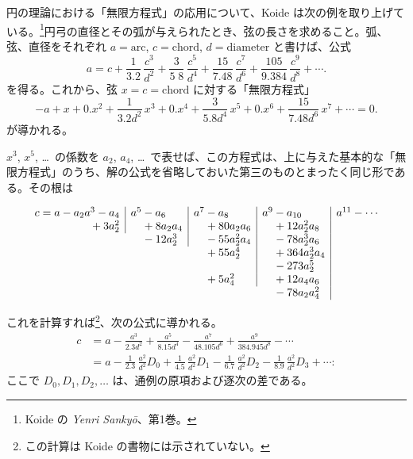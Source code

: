\documentclass[11pt]{article}
\newcommand{\scanpage}[2]{\clearpage\setcounter{footnote}{0}\noindent{\footnotesize\color{gray}PDF #1 頁 · #2}\par\medskip}
\begin{document}
円の理論における「無限方程式」の応用について、Koide は次の例を取り上げている。\footnote{Koide の \emph{Yenri Sankyō}、第1巻。}円弓の直径とその弧が与えられたとき、弦の長さを求めること。弧、弦、直径をそれぞれ $a=\mathrm{arc}$, $c=\mathrm{chord}$, $d=\mathrm{diameter}$ と書けば、公式
\[
a=c+\frac{1}{3.2}\,\frac{c^3}{d^2}+\frac{3}{5\;8}\mbox{}\,\frac{c^5}{d^4}+\frac{15}{7.48}\,\frac{c^7}{d^6}+\frac{105}{9.384}\,\frac{c^9}{d^8}+\cdots.
\]
を得る。これから、弦 $x=c=\mathrm{chord}$ に対する「無限方程式」
\[
-a+x+0.x^2+\frac{1}{3.2d^2}\,x^3+0.x^4+\frac{3}{5.8d^4}\,x^5+0.x^6+\frac{15}{7.48d^6}\,x^7+\cdots=0.
\]
が導かれる。

$x^3$, $x^5$, \ldots\ の係数を $a_2$, $a_4$, \ldots\ で表せば、この方程式は、上に与えた基本的な「無限方程式」のうち、解の公式を省略しておいた第三のものとまったく同じ形である。その根は

\scanpage{0291}{印刷頁 277}
\[
\begin{array}{r|l|l|l|l}
c=a-a_2a^3-a_4 & a^5-a_6 & a^7-a_8 & a^9-a_{10} & a^{11}-\cdots\\
{}+3a_2^2 & \quad{}+8a_2a_4 & \quad{}+80a_2a_6 & \quad{}+12a_2^2a_8 & \\
\multicolumn{1}{r}{} & \quad{}-12a_2^3 & \quad{}-55a_2^2a_4 & \quad{}-78a_2^3a_6 & \\
\multicolumn{1}{r}{} & \multicolumn{1}{l}{} & \quad{}+55a_2^4 & \quad{}+364a_2^3a_4 & \\
\multicolumn{1}{r}{} & \multicolumn{1}{l}{} & & \quad{}-273a_2^5 & \\
\multicolumn{1}{r}{} & \multicolumn{1}{l}{} & \quad{}+5a_4^2 & \quad{}+12a_4a_6 & \\
\multicolumn{1}{r}{} & \multicolumn{1}{l}{} & \multicolumn{1}{l}{} & \quad{}-78a_2a_4^2 &
\end{array}
\]

これを計算すれば\footnote{この計算は Koide の書物には示されていない。}、次の公式に導かれる。
\[
\begin{aligned}
c&=a-\frac{a^3}{2.3d^2}+\frac{a^5}{8.15d^4}-\frac{a^7}{48.105d^6}+\frac{a^9}{384.945d^8}-\cdots\\
&=a-\frac{1}{2.3}\,\frac{a^2}{d^2}D_0+\frac{1}{4.5}\,\frac{a^2}{d^2}D_1-\frac{1}{6.7}\,\frac{a^2}{d^2}D_2-\frac{1}{8.9}\,\frac{a^2}{d^2}D_3+\cdots:\text{}
\end{aligned}
\]
ここで $D_0, D_1, D_2, \ldots$ は、通例の原項および逐次の差である。
\end{document}
